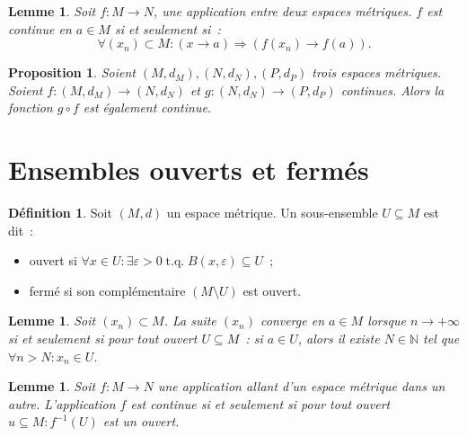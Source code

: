 \documentclass{report}
\newtheorem{prp}[thm]{Proposition}
\newtheorem{lem}[thm]{Lemme}
\theoremstyle{definition}
\newtheorem{déf}[thm]{Définition}
\theoremstyle{remark}
\DeclareMathOperator{\tq}{\text{ t.q. }}
\newcommand{\N}{\mathbb N}
\newcommand{\pinfty}{{+\infty}}
\begin{document}
		\begin{lem} Soit $f : M \to N$, une application entre deux espaces métriques. $f$ est continue en $a \in M$ si et seulement si~:
		\[\forall (x_n) \subset M : \left(x \to a\right) \Rightarrow \left(f(x_n) \to f(a)\right).\]
		\end{lem}

		\begin{prp} Soient $(M, d_M), (N, d_N), (P, d_P)$ trois espaces métriques. Soient $f : (M, d_M) \to (N, d_N)$ et $g : (N, d_N) \to (P, d_P)$ continues.
		Alors la fonction $g \circ f$ est également continue.
		\end{prp}

	\section{Ensembles ouverts et fermés}
		\begin{déf} Soit $(M, d)$ un espace métrique. Un sous-ensemble $U \subseteq M$ est dit~:
		\begin{itemize}
			\item ouvert si $\forall x \in U : \exists \varepsilon > 0 \tq B(x, \varepsilon) \subseteq U$~;
			\item fermé si son complémentaire $(M \setminus U)$ est ouvert.
		\end{itemize}
		\end{déf}

		\begin{lem}\label{lem:suiteconvouverts} Soit $(x_n) \subset M$. La suite $(x_n)$ converge en $a \in M$ lorsque $n \to \pinfty$ si et seulement si pour
		tout ouvert $U \subseteq M$~: si $a \in U$, alors il existe $N \in \N$ tel que $\forall n > N : x_n \in U$.
		\end{lem}

		\begin{lem}\label{lem:continuitéouverts} Soit $f : M \to N$ une application allant d'un espace métrique dans un autre. L'application $f$ est continue si
		et seulement si pour tout ouvert $u \subseteq M : f^{-1}(U)$ est un ouvert.
		\end{lem}
\end{document}
